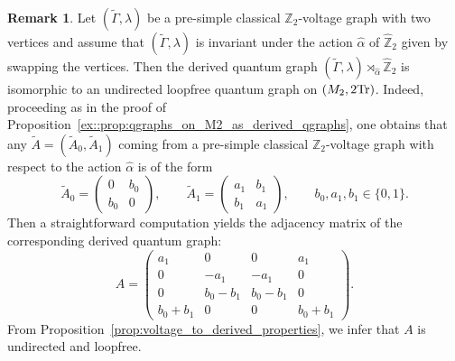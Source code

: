\documentclass{amsart}
\theoremstyle{definition}
\newtheorem{remark}[thm]{Remark}
\theoremstyle{definition}
\begin{document}
\begin{remark}
Let $(\tilde{\Gamma},\lambda)$ be a pre-simple classical $\mathbb{Z}_2$-voltage graph with two vertices and assume that $(\tilde{\Gamma},\lambda)$ is invariant under the action $\hat{\alpha}$ of $\hat{\mathbb{Z}}_2$ given by swapping the vertices. Then the derived quantum graph $(\tilde{\Gamma},\lambda)\rtimes_{\hat{\alpha}}\hat{\mathbb{Z}}_2$ is isomorphic to an undirected loopfree quantum graph on $(M_2,2{\rm Tr})$. Indeed, proceeding as in the proof of Proposition~\ref{ex::prop:qgraphs_on_M2_as_derived_qgraphs}, one obtains that any $\tilde{A}=(\tilde{A}_0,\tilde{A}_1)$ coming from a pre-simple classical $\mathbb{Z}_2$-voltage graph with respect to the action $\hat{\alpha}$ is of the form
    \[
\tilde{A}_0=\begin{pmatrix}0 & b_0\\ b_0 & 0 \end{pmatrix},\qquad \tilde{A}_1=\begin{pmatrix}a_1 & b_1\\ b_1 & a_1\end{pmatrix},\qquad b_0,a_1,b_1\in\{0,1\}.
\]
Then a straightforward computation yields the adjacency matrix of the corresponding derived quantum graph:
\begin{equation}\label{ex::quantder1}
A=\begin{pmatrix}a_1 & 0 & 0 & a_1\\ 0 & -a_1 & -a_1 & 0 \\ 0 & b_0-b_1 & b_0-b_1 & 0\\ b_0+b_1 & 0 & 0 & b_0+b_1\end{pmatrix}.
\end{equation}
From Proposition~\ref{prop:voltage_to_derived_properties}, we infer that $A$ is undirected and loopfree.
\end{remark}

\printbibliography
\end{document}
